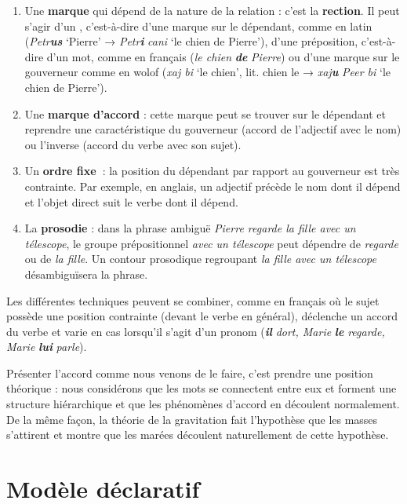 {    \begin{enumerate}
    \item    Une \textbf{marque} qui dépend de la nature de la relation : c’est la \textbf{rection}. Il peut s’agir d’un , c’est-à-dire d’une marque sur le dépendant, comme en latin (\textit{Petr}\textbf{\textit{us}} ‘Pierre’ \textrm{→} \textit{Petr}\textbf{\textit{i}} \textit{cani} ‘le chien de Pierre’), d’une préposition, c’est-à-dire d’un mot, comme en français (\textit{le chien} \textbf{\textit{de} }\textit{Pierre}) ou d’une marque sur le gouverneur comme en wolof (\textit{xaj bi} ‘le chien’, lit. chien le \textrm{→} \textit{xaj}\textbf{\textit{u}} \textit{Peer bi} ‘le chien de Pierre’).
    \item    Une \textbf{marque d’accord} : cette marque peut se trouver sur le dépendant et reprendre une caractéristique du gouverneur (accord de l’adjectif avec le nom) ou l’inverse (accord du verbe avec son sujet).
    \item    Un \textbf{ordre fixe~}: la position du dépendant par rapport au gouverneur est très contrainte. Par exemple, en anglais, un adjectif précède le nom dont il dépend et l’objet direct suit le verbe dont il dépend.
    \item   La \textbf{prosodie} : dans la phrase ambiguë \textit{Pierre regarde la fille avec un télescope}, le groupe prépositionnel \textit{avec un télescope} peut dépendre de \textit{regarde} ou de \textit{la fille}. Un contour prosodique regroupant \textit{la fille avec un télescope} désambiguïsera la phrase.
    \end{enumerate}

    Les différentes techniques peuvent se combiner, comme en français où le sujet possède une position contrainte (devant le verbe en général), déclenche un accord du verbe et varie en cas lorsqu’il s’agit d’un pronom (\textbf{\textit{il}} \textit{dort, Marie} \textbf{\textit{le}} \textit{regarde, Marie} \textbf{\textit{lui}} \textit{parle}).

    Présenter l’accord comme nous venons de le faire, c’est prendre une position théorique : nous considérons que les mots se connectent entre eux et forment une structure hiérarchique et que les phénomènes d’accord en découlent normalement. De la même façon, la théorie de la gravitation fait l’hypothèse que les masses s’attirent et montre que les marées découlent naturellement de cette hypothèse.
}
\section{Modèle déclaratif}\label{sec:1.3.4}

